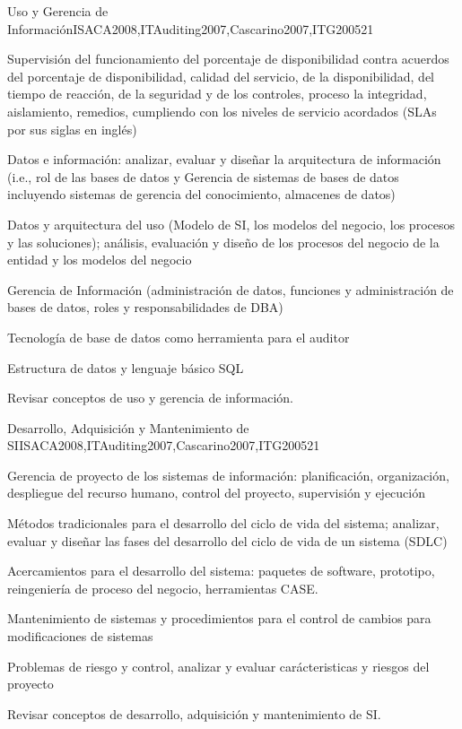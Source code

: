 \begin{syllabus}
	\begin{unit}{Uso y Gerencia de Información}{}{ISACA2008,ITAuditing2007,Cascarino2007,ITG2005}{2}{1}
	\begin{topics}
	\item Supervisión del funcionamiento del porcentaje de disponibilidad contra acuerdos del porcentaje de disponibilidad, calidad del servicio, de la disponibilidad, del tiempo de reacción, de la seguridad y de los controles, proceso la integridad, aislamiento, remedios, cumpliendo con los niveles de servicio acordados (SLAs por sus siglas en
	inglés)
	\item Datos e información: analizar, evaluar y diseñar la arquitectura de información (i.e., rol de las bases de datos y Gerencia de sistemas de bases de datos incluyendo sistemas de gerencia del conocimiento, almacenes de datos)
	\item Datos y arquitectura del uso (Modelo de SI, los modelos del negocio, los procesos y las soluciones); análisis, evaluación y diseño de los procesos del negocio de la entidad y los modelos del negocio
	\item Gerencia de Información (administración de datos, funciones y administración de bases de datos, roles y responsabilidades de DBA)
	\item Tecnología de base de datos como herramienta para el auditor
	\item Estructura de datos y lenguaje básico SQL
	\end{topics}
	\begin{learningoutcomes}
	\item Revisar conceptos de uso y gerencia de información.
	\end{learningoutcomes}
	\end{unit}
	
	\begin{unit}{Desarrollo, Adquisición y Mantenimiento de SI}{}{ISACA2008,ITAuditing2007,Cascarino2007,ITG2005}{2}{1}
	\begin{topics}
	\item Gerencia de proyecto de los sistemas de información: planificación, organización, despliegue del recurso humano, control del proyecto, supervisión y ejecución
	\item Métodos tradicionales para el desarrollo del ciclo de vida del sistema; analizar, evaluar y diseñar las fases del desarrollo del ciclo de vida de un sistema (SDLC)
	\item Acercamientos para el desarrollo del sistema: paquetes de software, prototipo, reingeniería de proceso del negocio, herramientas CASE.
	\item Mantenimiento de sistemas y procedimientos para el control de cambios para modificaciones de sistemas
	\item Problemas de riesgo y control, analizar y evaluar carácteristicas y riesgos del proyecto
	\end{topics}
	\begin{learningoutcomes}
	\item Revisar conceptos de desarrollo, adquisición y mantenimiento de SI.
	\end{learningoutcomes}
	\end{unit}
	

\end{syllabus}
